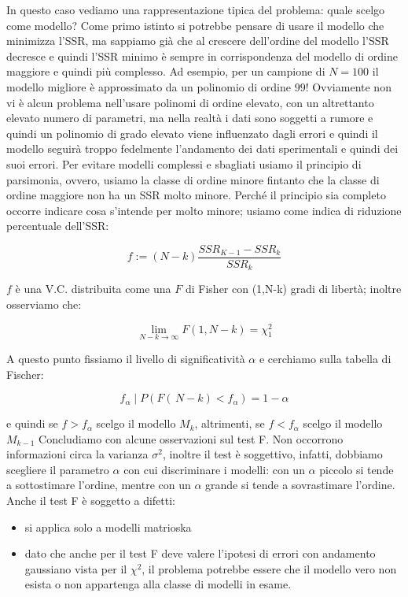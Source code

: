 In questo caso vediamo una rappresentazione tipica del problema: quale scelgo come modello? Come primo istinto si potrebbe pensare di usare il modello che minimizza l'SSR, ma sappiamo già che al crescere dell'ordine del modello l'SSR decresce e quindi l'SSR minimo è sempre in corrispondenza del modello di ordine maggiore e quindi più complesso. Ad esempio, per un campione di $N=100$ il modello migliore è approssimato da un polinomio di ordine $99$! Ovviamente non vi è alcun problema nell'usare polinomi di ordine elevato, con un altrettanto elevato numero di parametri, ma nella realtà i dati sono soggetti a rumore e quindi un polinomio di grado elevato viene influenzato dagli errori e quindi il modello seguirà troppo fedelmente l'andamento dei dati sperimentali e quindi dei suoi errori.\newline
Per evitare modelli complessi e sbagliati usiamo il principio di parsimonia, ovvero, usiamo la classe di ordine minore fintanto che la classe di ordine maggiore non ha un SSR molto minore. Perché il principio sia completo occorre indicare cosa s'intende per molto minore; usiamo come indica di riduzione percentuale dell'SSR:

    \[ f:=(N-k)\frac{SSR_{K-1}-SSR_k}{SSR_k} \]

$f$ è una V.C. distribuita come una $F$ di Fisher con (1,N-k) gradi di libertà; inoltre osserviamo che:

    \[ \lim_{N-k\rightarrow\infty} {F(1,N-k)}=\chi_1^2 \]

A questo punto fissiamo il livello di significatività $\alpha$ e cerchiamo sulla tabella di Fischer:

    \[ f_\alpha \mid P(F(\,N-k)<f_\alpha)=1-\alpha \]

e quindi se $f>f_\alpha$ scelgo il modello $M_k$, altrimenti, se $f<f_\alpha$ scelgo il modello $M_{k-1}$
Concludiamo con alcune osservazioni sul test F. Non occorrono informazioni circa la varianza $\sigma^2$, inoltre il test è soggettivo, infatti, dobbiamo scegliere il parametro $\alpha$ con cui discriminare i modelli: con un $\alpha$ piccolo si tende a sottostimare l'ordine, mentre con un $\alpha$ grande si tende a sovrastimare l'ordine.\newline
Anche il test F è soggetto a difetti:
\begin{itemize}
  \item si applica solo a modelli matrioska
  \item dato che anche per il test F deve valere l'ipotesi di errori con andamento gaussiano vista per il $\chi^2$, il problema potrebbe essere che il modello vero non esista o non appartenga alla classe di modelli in esame.
\end{itemize}
